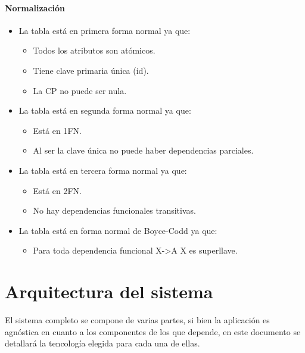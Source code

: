 \documentclass[12pt,a4paperpaper,]{report}
\providecommand{\tightlist}{%
  \setlength{\itemsep}{0pt}\setlength{\parskip}{0pt}}
\let\oldparagraph\paragraph
\renewcommand{\paragraph}[1]{\oldparagraph{#1}\mbox{}}
\begin{document}
\paragraph{Normalización}\label{normalizaciuxf3n-15}

\begin{itemize}
\tightlist
\item
  La tabla está en primera forma normal ya que:

  \begin{itemize}
  \tightlist
  \item
    Todos los atributos son atómicos.
  \item
    Tiene clave primaria única (id).
  \item
    La CP no puede ser nula.
  \end{itemize}
\item
  La tabla está en segunda forma normal ya que:

  \begin{itemize}
  \tightlist
  \item
    Está en 1FN.
  \item
    Al ser la clave única no puede haber dependencias parciales.
  \end{itemize}
\item
  La tabla está en tercera forma normal ya que:

  \begin{itemize}
  \tightlist
  \item
    Está en 2FN.
  \item
    No hay dependencias funcionales transitivas.
  \end{itemize}
\item
  La tabla está en forma normal de Boyce-Codd ya que:

  \begin{itemize}
  \tightlist
  \item
    Para toda dependencia funcional X-\textgreater{}A X es superllave.
  \end{itemize}
\end{itemize}

\section{Arquitectura del sistema}\label{arquitectura-del-sistema}

El sistema completo se compone de varias partes, si bien la aplicación
es agnóstica en cuanto a los componentes de los que depende, en este
documento se detallará la tencología elegida para cada una de ellas.
\end{document}
